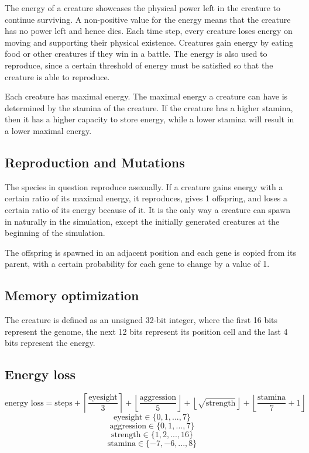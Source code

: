 \documentclass{article}
\begin{document}
The energy of a creature showcases the physical power left in the creature to continue surviving. A non-positive value for the energy means that the creature has no power left and hence dies. Each time step, every creature loses energy on moving and supporting their physical existence. Creatures gain energy by eating food or other creatures if they win in a battle. The energy is also used to reproduce, since a certain threshold of energy must be satisfied so that the creature is able to reproduce.

Each creature has maximal energy. The maximal energy a creature can have is determined by the stamina of the creature. If the creature has a higher stamina, then it has a higher capacity to store energy, while a lower stamina will result in a lower maximal energy.

\subsection{Reproduction and Mutations}

The species in question reproduce asexually. If a creature gains energy with a certain ratio of its maximal energy, it reproduces, gives 1 offspring, and loses a certain ratio of its energy because of it. It is the only way a creature can spawn in naturally in the simulation, except the initially generated creatures at the beginning of the simulation.

The offspring is spawned in an adjacent position and each gene is copied from its parent, with a certain probability for each gene to change by a value of 1.

\subsection{Memory optimization}
The creature is defined as an unsigned 32-bit integer, where the first 16 bits represent the genome, the next 12 bits represent its position cell and the last 4 bits represent the energy.

\subsection{Energy loss}

\[\text{energy loss}=\text{steps}+\left\lceil\frac{\text{eyesight}}{3}\right\rceil+\left\lfloor\frac{\text{aggression}}{5}\right\rfloor+\left\lfloor\sqrt{\text{strength}}\right\rfloor+\left\lfloor\frac{\text{stamina}}{7}+1\right\rfloor\]
\[\text{eyesight}\in\{0,1,...,7\}\]
\[\text{aggression}\in\{0,1,...,7\}\]
\[\text{strength}\in\{1,2,...,16\}\]
\[\text{stamina}\in\{-7,-6,...,8\}\]
\end{document}
